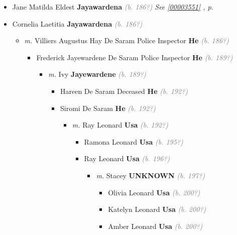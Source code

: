 \documentclass[10pt, openany]{book}
\begin{document}
\begin{itemize}
{\begin{itemize}
{   }
\item{Jane Matilda Eldest \textbf{Jayawardena} \textcolor{gray}{\textit{(b. 186?)}} \textcolor{slteal}{\textit{See  \autoref{00003551} \textit{, p. \pageref{00003551} }}}}
\item{Cornelia Laetitia \textbf{Jayawardena} \textcolor{gray}{\textit{(b. 186?)}}
\begin{itemize}
\item{\textit{m.} Villiers Augustus Hay De Saram Police Inspector \textbf{He} \textcolor{gray}{\textit{(b. 186?)}}   \label{couple:00003523:00003524} \begin{itemize}
\item{Frederick Jayewardene De Saram Police Inspector \textbf{He} \textcolor{gray}{\textit{(b. 189?)}}
\begin{itemize}
\item{\textit{m.} Ivy \textbf{Jayewardene} \textcolor{gray}{\textit{(b. 189?)}}   \label{couple:00003525:00003526} \begin{itemize}
\item{Hareen De Saram Deceased \textbf{He} \textcolor{gray}{\textit{(b. 192?)}}
    }
\item{Siromi De Saram \textbf{He} \textcolor{gray}{\textit{(b. 192?)}}
\begin{itemize}
\item{\textit{m.} Ray Leonard \textbf{Usa} \textcolor{gray}{\textit{(b. 192?)}}   \label{couple:00003539:00003540} \begin{itemize}
\item{Ramona Leonard \textbf{Usa} \textcolor{gray}{\textit{(b. 195?)}}
  }
\item{Ray Leonard \textbf{Usa} \textcolor{gray}{\textit{(b. 196?)}}
\begin{itemize}
\item{\textit{m.} Stacey \textbf{UNKNOWN} \textcolor{gray}{\textit{(b. 197?)}}   \label{couple:00003541:00003542} \begin{itemize}
\item{Olivia Leonard \textbf{Usa} \textcolor{gray}{\textit{(b. 200?)}}
  }
\item{Katelyn Leonard \textbf{Usa} \textcolor{gray}{\textit{(b. 200?)}}
  }
\item{Amber Leonard \textbf{Usa} \textcolor{gray}{\textit{(b. 200?)}}
}
\end{itemize}}
\end{itemize}}
\end{itemize}}
\end{itemize}}
\end{itemize}}
\end{itemize}}
\end{itemize}}
\end{itemize}}
\end{itemize}}
\end{itemize}
\end{document}

